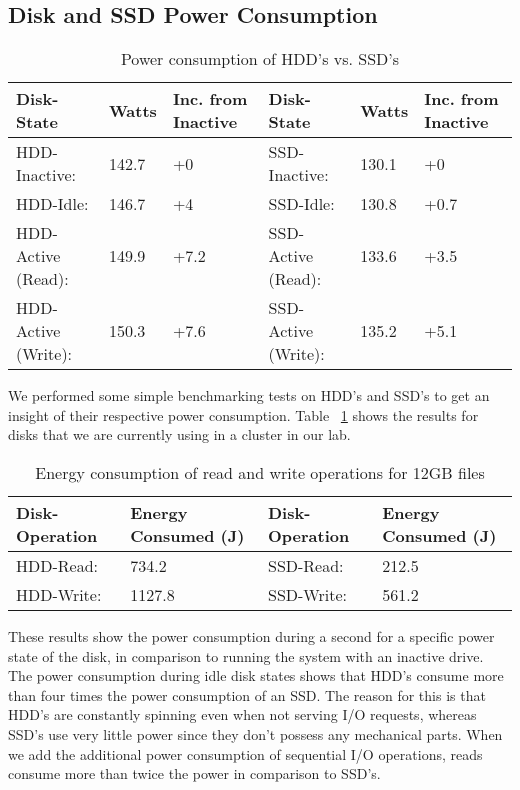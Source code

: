 \subsection{Disk and SSD Power Consumption}

\begin{table}
  \centering
  \resizebox{\linewidth}{!}
  {
    \begin{tabular}{|l|l|l|l|l|l|}
      \hline
      \bf Disk-State & \bf Watts & \bf Inc. from Inactive & \bf Disk-State & \bf
      Watts & \bf Inc. from Inactive \\ \hline
      HDD-Inactive:       & 142.7 & +0   & SSD-Inactive:       & 130.1 & +0   \\
      \hline
      HDD-Idle:           & 146.7 & +4   & SSD-Idle:           & 130.8 & +0.7 \\
      \hline
      HDD-Active (Read):  & 149.9 & +7.2 & SSD-Active (Read):  & 133.6 & +3.5 \\
      \hline
      HDD-Active (Write): & 150.3 & +7.6 & SSD-Active (Write): & 135.2 & +5.1 \\
      \hline
    \end{tabular}
  }
  \caption{Power consumption of HDD's vs. SSD's}
  \label{tab:power-consumption}
\end{table}

We performed some simple benchmarking tests on HDD's and SSD's to get an insight
of their respective power consumption. Table ~\ref{tab:power-consumption} shows
the results for disks that we are currently using in a cluster in our lab.

\begin{table}
  \centering
  \resizebox{\linewidth}{!}
  {
    \begin{tabular}{|l|l|l|l|}
      \hline
      \bf Disk-Operation & \bf Energy Consumed (J) & \bf Disk-Operation & \bf
      Energy Consumed (J) \\ \hline
      HDD-Read:  & 734.2  & SSD-Read:  & 212.5 \\ \hline
      HDD-Write: & 1127.8 & SSD-Write: & 561.2 \\ \hline
    \end{tabular}
  }
  \caption{Energy consumption of read and write operations for 12GB files}
  \label{tab:energy-consumption}
\end{table}

These results show the power consumption during a second for a specific power
state of the disk, in comparison to running the system with an inactive
drive. The power consumption during idle disk states shows that HDD's consume
more than four times the power consumption of an SSD. The reason for this is
that HDD's are constantly spinning even when not serving I/O requests, whereas
SSD's use very little power since they don't possess any mechanical parts. When
we add the additional power consumption of sequential I/O operations, reads
consume more than twice the power in comparison to SSD's.

